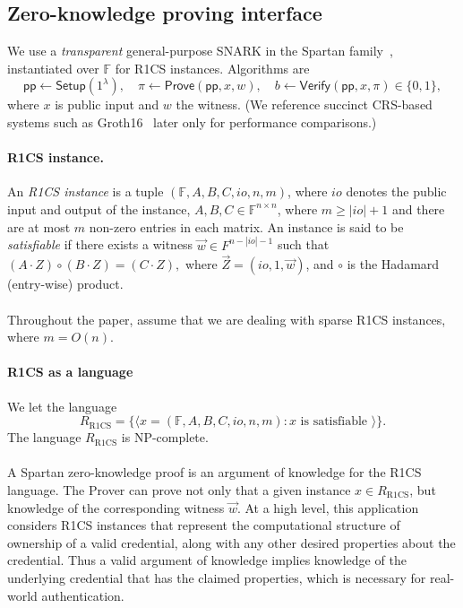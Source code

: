 \subsection{Zero-knowledge proving interface}
\label{subsec:zk-interface}
We use a \emph{transparent} general-purpose SNARK in the Spartan family~\cite{C:Setty20}, instantiated over $\mathbb{F}$ for R1CS instances.
Algorithms are
\[
\mathsf{pp} \leftarrow \mathsf{Setup}(1^\lambda),\quad
\pi \leftarrow \mathsf{Prove}(\mathsf{pp},x,w),\quad
b \leftarrow \mathsf{Verify}(\mathsf{pp},x,\pi)\in\{0,1\},
\]
where $x$ is public input and $w$ the witness.
(We reference succinct CRS-based systems such as Groth16~\cite{groth2016size} later only for performance comparisons.)

\paragraph{R1CS instance.}
An \textit{R1CS instance} is a tuple $(\mathbb{F}, A, B, C, io, n, m)$, 
where $io$ denotes the public input and output of the instance, 
$A, B, C \in \mathbb{F}^{n \times n}$, where $m \geq |io| + 1$
and there are at most $m$ non-zero entries in each matrix. An instance is said to be \textit{satisfiable}
if there exists a witness $\vec{w} \in F^{n - |io| - 1}$ such that
$(A \cdot Z) \circ (B \cdot Z) = (C \cdot Z),$
where $\vec{Z} = (io, 1, \vec{w})$, and $\circ$ is the Hadamard (entry-wise) product.

\paragraph{} Throughout the paper, assume that we are dealing with sparse R1CS instances, where $m = O(n)$.

\paragraph{R1CS as a language} We let the language 
\[
R_{\text{R1CS}} = \{ \langle x = (\mathbb{F}, A, B, C, io, n, m): \text{$x$ is satisfiable }\rangle \}.
\]
The language $R_{\text{R1CS}}$ is NP-complete.

\paragraph{} A Spartan zero-knowledge proof is an argument of knowledge for the R1CS language.
The Prover can prove not only that a given instance $x \in R_{\text{R1CS}}$, but knowledge of the corresponding witness $\vec{w}$.   
At a high level, this application considers R1CS instances that represent the computational structure of ownership of a valid credential, along with any other desired properties about the credential. 
Thus a valid argument of knowledge implies knowledge of the underlying credential that has the claimed properties, which is necessary for real-world authentication.

